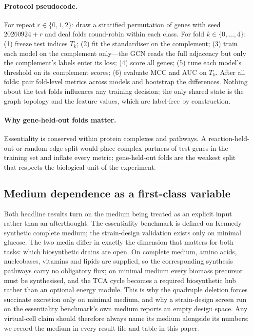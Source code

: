 \documentclass[12pt]{article}
\begin{document}
\paragraph{Protocol pseudocode.} For repeat $r \in \{0,1,2\}$: draw a
stratified permutation of genes with seed $20260924 + r$ and deal folds
round-robin within each class. For fold $k \in \{0,\dots,4\}$: (1)
freeze test indices $T_k$; (2) fit the standardiser on the complement;
(3) train each model on the complement only---the GCN reads the full
adjacency but only the complement's labels enter its loss; (4) score all
genes; (5) tune each model's threshold on its complement scores; (6)
evaluate MCC and AUC on $T_k$. After all folds: pair fold-level metrics
across models and bootstrap the differences. Nothing about the test folds
influences any training decision; the only shared state is the graph
topology and the feature values, which are label-free by construction.

\paragraph{Why gene-held-out folds matter.} Essentiality is conserved
within protein complexes and pathways. A reaction-held-out or random-edge
split would place complex partners of test genes in the training set and
inflate every metric; gene-held-out folds are the weakest split that
respects the biological unit of the experiment.

\subsection{Medium dependence as a first-class variable}
Both headline results turn on the medium being treated as an explicit
input rather than an afterthought. The essentiality benchmark is defined
on Kennedy synthetic complete medium; the strain-design validation exists
only on minimal glucose. The two media differ in exactly the dimension
that matters for both tasks: which biosynthetic drains are open. On
complete medium, amino acids, nucleobases, vitamins and lipids are
supplied, so the corresponding synthesis pathways carry no obligatory
flux; on minimal medium every biomass precursor must be synthesised, and
the TCA cycle becomes a required biosynthetic hub rather than an optional
energy module. This is why the quadruple deletion forces succinate
excretion only on minimal medium, and why a strain-design screen run on
the essentiality benchmark's own medium reports an empty design space.
Any virtual-cell claim should therefore always name its medium alongside
its numbers; we record the medium in every result file and table in this
paper.
\end{document}

